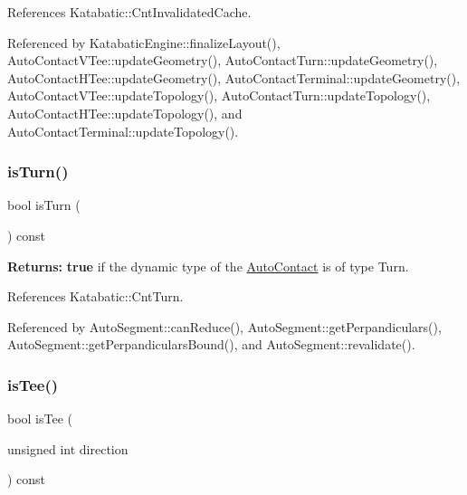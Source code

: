 References Katabatic\+::\+Cnt\+Invalidated\+Cache.



Referenced by Katabatic\+Engine\+::finalize\+Layout(), Auto\+Contact\+V\+Tee\+::update\+Geometry(), Auto\+Contact\+Turn\+::update\+Geometry(), Auto\+Contact\+H\+Tee\+::update\+Geometry(), Auto\+Contact\+Terminal\+::update\+Geometry(), Auto\+Contact\+V\+Tee\+::update\+Topology(), Auto\+Contact\+Turn\+::update\+Topology(), Auto\+Contact\+H\+Tee\+::update\+Topology(), and Auto\+Contact\+Terminal\+::update\+Topology().

\mbox{\label{classKatabatic_1_1AutoContact_a249530ac086dbf92f981887cc633facf}} 
\subsubsection{\texorpdfstring{is\+Turn()}{isTurn()}}
{\footnotesize\ttfamily bool is\+Turn (\begin{DoxyParamCaption}{ }\end{DoxyParamCaption}) const\hspace{0.3cm}{\ttfamily [inline]}}

{\bfseries Returns\+:} {\bfseries true} if the dynamic type of the \hyperlink{classKatabatic_1_1AutoContact}{Auto\+Contact} is of type Turn. 

References Katabatic\+::\+Cnt\+Turn.



Referenced by Auto\+Segment\+::can\+Reduce(), Auto\+Segment\+::get\+Perpandiculars(), Auto\+Segment\+::get\+Perpandiculars\+Bound(), and Auto\+Segment\+::revalidate().

\mbox{\label{classKatabatic_1_1AutoContact_ae4ba7bc2888f990818cbdb808260c47e}} 
\subsubsection{\texorpdfstring{is\+Tee()}{isTee()}}
{\footnotesize\ttfamily bool is\+Tee (\begin{DoxyParamCaption}\item[{unsigned int}]{direction }\end{DoxyParamCaption}) const}

